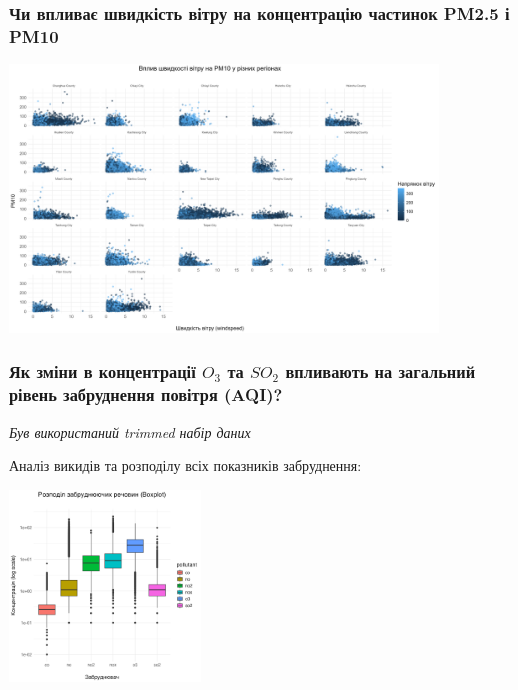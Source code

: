 \documentclass{beamer}
\begin{document}
\begin{frame}
  \frametitle{Чи впливає швидкість вітру на концентрацію частинок PM2.5 і PM10}

  \begin{center}
    \includegraphics[height=2.8in]{plots/question1/scatter_pm10_region.png}

  \end{center}
\end{frame}


\begin{frame}
  \frametitle{Як зміни в концентрації $O_3$ та $SO_2$ впливають на загальний рівень забруднення повітря (AQI)?}

  \textit{Був використаний trimmed набір даних}

  Аналіз викидів та розподілу всіх показників забруднення:

  \begin{center}
    \includegraphics[height=2in]{plots/question2/boxplot_pollutants.png}
  \end{center}
\end{frame}
\end{document}
